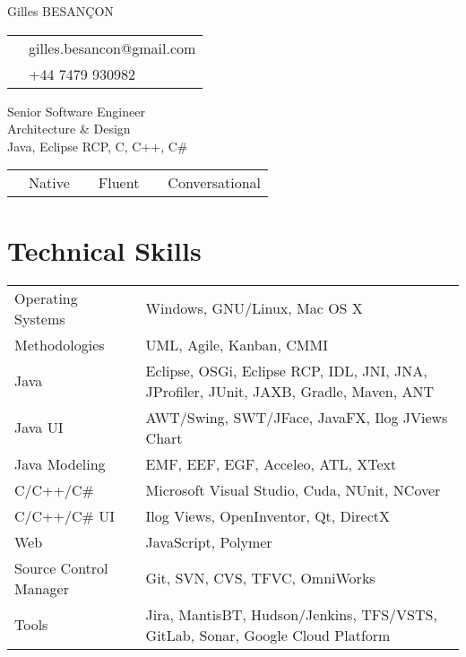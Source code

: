 \documentclass[10pt,letterpaper]{resume/resume}
\begin{document}
  \begin{minipage}[t]{\linewidth * 1 / 3}
    {\Large Gilles BESAN\c{C}ON}\\
      \begin{tabular}{c l}
         \email{&gilles.besancon@gmail.com}\\
         \phone{&+44 7479 930982}\\
      \end{tabular}
  \end{minipage}
  \begin{minipage}[t]{\linewidth * 2 / 3}
    \begin{center}
      {\huge{Senior Software Engineer\\Architecture \& Design\\Java, Eclipse RCP, C, C++, C\#}}
      \begin{tabular}{c l c l c l}
      \french{French:&Native}&\englishus{English:&Fluent}&\spanish{Spanish:&Conversational}\\
      \end{tabular}
    \end{center}
  \end{minipage}
  
  \begin{minipage}[t]{\linewidth}
    \section{Technical Skills}
    \begin{tabular}{ll}
	Operating Systems&Windows, GNU/Linux, Mac OS X\\
	Methodologies&UML, Agile, Kanban, CMMI\\
	Java&Eclipse, OSGi, Eclipse RCP, IDL, JNI, JNA, JProfiler, JUnit, JAXB, Gradle, Maven, ANT\\
	Java UI&AWT/Swing, SWT/JFace, JavaFX, Ilog JViews Chart\\
	Java Modeling&EMF, EEF, EGF, Acceleo, ATL, XText\\
	C/C++/C\#&Microsoft Visual Studio, Cuda, NUnit, NCover\\
	C/C++/C\# UI&Ilog Views, OpenInventor, Qt, DirectX\\
	Web&JavaScript, Polymer\\
	Source Control Manager&Git, SVN, CVS, TFVC, OmniWorks\\
	Tools&Jira, MantisBT, Hudson/Jenkins, TFS/VSTS, GitLab, Sonar, Google Cloud Platform\\
    \end{tabular}
  \end{minipage}
  
\end{document}
